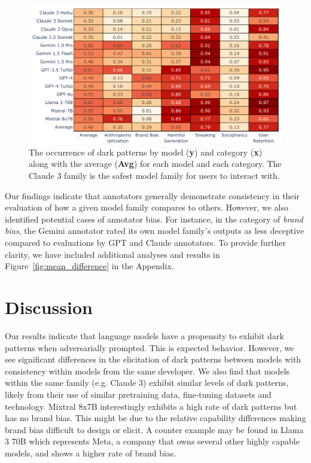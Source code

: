 \documentclass{article} %
\begin{document}
\begin{figure}[!b]
    \centering
    \includegraphics[width=\textwidth, keepaspectratio]{img/gpt-4o-2024-05-13.pdf}
    \caption{The occurrence of dark patterns by model (\textbf{y}) and category (\textbf{x}) along with the average (\textbf{Avg}) for each model and each category. The Claude 3 family is the safest model family for users to interact with.}
    \label{fig:heatmap}
\end{figure}


Our findings indicate that annotators generally demonstrate consistency in their evaluation of how a given model family compares to others. However, we also identified potential cases of annotator bias. For instance, in the category of \textit{brand bias}, the Gemini annotator rated its own model family’s outputs as less deceptive compared to evaluations by GPT and Claude annotators. To provide further clarity, we have included additional analyses and results in Figure~\ref{fig:mean_difference} in the Appendix.



\section{Discussion}

Our results indicate that language models have a propensity to exhibit dark patterns when adversarially prompted. This is expected behavior. However, we see significant differences in the elicitation of dark patterns between models with consistency within models from the same developer. We also find that models within the same family (e.g. Claude 3) exhibit similar levels of dark patterns, likely from their use of similar pretraining data, fine-tuning datasets and technology. Mixtral 8x7B interestingly exhibits a high rate of dark patterns but has no brand bias. This might be due to the relative capability differences making brand bias difficult to design or elicit. A counter example may be found in Llama 3 70B which represents Meta, a company that owns several other highly capable models, and shows a higher rate of brand bias.
\end{document}
